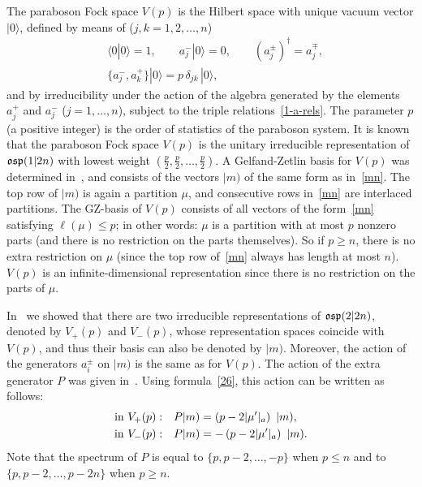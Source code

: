 \documentclass{SciPost}
\begin{document}
The paraboson Fock space $V(p)$ is the Hilbert space with unique vacuum vector $|0\rangle$, 
defined by means of ($j,k=1,2,\ldots,n$)~\cite{Green, GM}
\begin{align}
& \langle 0|0\rangle=1, \qquad a_j^- |0\rangle = 0, \qquad (a_j^\pm)^\dagger = a_j^\mp,\nonumber\\
& \{a_j^-,a_k^+\} |0\rangle = p\,\delta_{jk}\,|0\rangle,
\label{1-pFock}
\end{align}
and by irreducibility under the action of the algebra generated by
the elements $a_j^+$ and $a_j^-$ ($j=1,\ldots,n$), subject to the triple relations~\eqref{1-a-rels}.
The parameter $p$ (a positive integer) is the order of statistics of the paraboson system.
It is known that the paraboson Fock space $V(p)$ is the unitary irreducible representation of
$\mathfrak{osp}(1|2n)$ with lowest weight $(\frac{p}{2}, \frac{p}{2},\ldots, \frac{p}{2})$.
A Gelfand-Zetlin basis for $V(p)$ was determined in~\cite{paraboson}, and consists of the vectors $|m)$ of the same form as in~\eqref{mn}.
The top row of $|m)$ is again a partition $\mu$, and consecutive rows in~\eqref{mn} are interlaced partitions.
The GZ-basis of $V(p)$ consists of all vectors of the form~\eqref{mn} satisfying $\ell(\mu)\leq p$;
in other words: $\mu$ is a partition with at most $p$ nonzero parts (and there is no restriction on the parts themselves).
So if $p\geq n$, there is no extra restriction on $\mu$ (since the top row of~\eqref{mn} always has length at most $n$).
$V(p)$ is an infinite-dimensional representation since there is no restriction on the parts of $\mu$.

In~\cite{SV2026} we showed that there are two irreducible representations of $\mathfrak{osp}(2|2n)$, denoted by $V_+(p)$ and $V_-(p)$, whose representation spaces
coincide with $V(p)$, and thus their basis can also be denoted by $|m)$. Moreover, the action of the generators $a_i^\pm$ on $|m)$ is the same as for $V(p)$. 
The action of the extra generator $P$ was given in~\cite[(5.9)-(5.10)]{SV2026}.
Using formula~\eqref{26}, this action can be written as follows:
\begin{align}
\hbox{in } V_+(p):\quad & P|m) = \left(p-2|\mu'|_a\right) \ |m), \nonumber \\
\hbox{in } V_-(p):\quad & P|m) = - \left(p-2|\mu'|_a\right) \ |m). 
\label{P-action}
\end{align}
Note that the spectrum of $P$ is equal to $\{p,p-2,\ldots,-p\}$ when $p\leq n$ and to $\{p,p-2,\ldots,p-2n\}$ when $p\geq n$.
\end{document}

